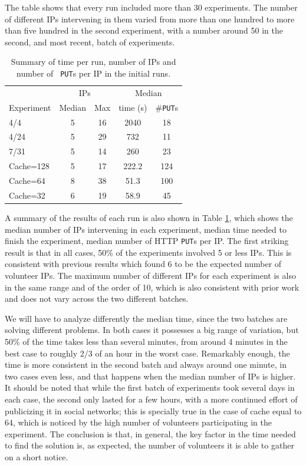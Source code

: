 \documentclass[letterpaper]{article}
\begin{document}
The table shows that every run included more than 30 experiments. The
number of different IPs intervening in them varied from more than one
hundred to more than five hundred in the second experiment, with a
number around 50 in the second, and most recent, batch of experiments. 
%
\begin{table}[htb]
\caption{Summary of time per run, number of IPs and number of {\tt
    PUT}s per IP in the initial runs. \label{tab:summary:os}}
\begin{center}
\begin{tabular}{l|cccc}
\hline
     & \multicolumn{2}{c}{IPs} & \multicolumn{2}{c}{Median} \\
Experiment & Median & Max & time (s) &  \#{\tt  PUT}s \\
\hline
4/4 & 5 & 16 & 2040 & 18   \\
4/24 &  5 & 29 & 732 & 11  \\
7/31 & 5 & 14 & 260 & 23   \\
\hline
Cache=128 & 5 & 17 & 222.2 & 124 \\ 
Cache=64 & 8 & 38 & 51.3 & 100 \\
Cache=32 & 6 & 19 & 58.9 & 45 \\
\hline
\end{tabular}
\end{center}
\end{table}
%

A summary of the results of each run is also shown in Table
\ref{tab:summary:os}, which shows the median number of IPs
intervening in each experiment,  median time needed
to finish the experiment, median number of HTTP {\tt PUT}s per IP. The
first striking result is that in all cases, 50\% of the 
experiments involved 5 or less IPs. This is consistent with previous results
\citep{DBLP:conf/gecco/GuervosG15} which found 6 to be
the expected number of volunteer IPs. The
maximum number of different IPs for each experiment is also in the
same range and of the order of 10, which is also consistent with
prior work and does not vary across the two different batches. 

We will have to analyze differently the median time, since the two
batches are solving different problems. In both cases it possesses a
big range of variation, but 50\% of 
the time takes less than several minutes, from around 4 minutes in the
best case to roughly 2/3 of an hour in the worst case. Remarkably
enough, the time is more consistent in the second batch and always
around one minute, in two cases even less, and that happens when the
median number of IPs is higher. It should be noted that while the
first batch of experiments took several days in each case, the second
only lasted for a few hours, with a more continued effort of
publicizing it in social networks; this is specially true in the
case of cache equal to 64, which is noticed by the high number of
volunteers participating in the experiment. The conclusion is that,
in general, the key factor in the time needed to find the solution
is, as expected, the number of volunteers it is able to gather on a
short notice. 
\end{document}

